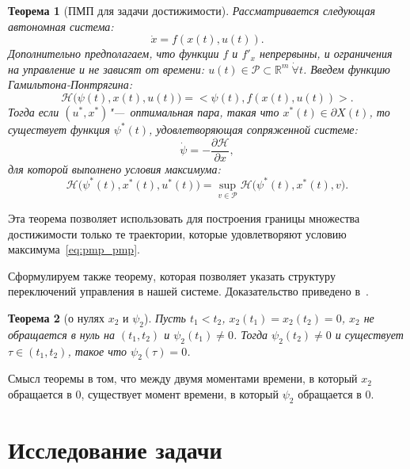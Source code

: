 \documentclass[12pt, a4paper]{article} %
\newtheorem{Th}{Теорема}
\newcommand{\Real}{\mathbb{R}}
\newcommand{\inner}[2]{\bigl< #1, #2 \bigr>}
\begin{document}
\begin{Th}[ПМП для задачи достижимости]\label{th:pmp}
    Рассматривается следующая автономная система:
    \begin{equation}\label{eq:pmp_sys}
        \dot x = f(x(t), u(t)).
    \end{equation} 
    Дополнительно предполагаем, что функции $f$ и $f'_x$ непрервыны,
    и ограничения на управление и не зависят от времени:
    $u(t) \in \mathcal{P} \subset \Real^{m}\ \dot \forall t$.
    Введем функцию Гамильтона-Понтрягина:
    \begin{equation}\label{eq:pmp_ham}
        \mathcal{H} \bigl( \psi(t), x(t), u(t) \bigr) = 
        \inner{\psi(t)}{f( x(t), u(t) )}.
    \end{equation} 
    Тогда если $(u^*, x^*)$"---~оптимальная пара,
    такая что  $x^*(t) \in \partial X(t)$, то существует функция $\psi^*(t)$,
    удовлетворяющая сопряженной системе:
    \begin{equation}\label{pmp_conj}
        \dot \psi = -\frac{\partial \mathcal{H}}{\partial x},
    \end{equation} 
    для которой выполнено условия максимума:
    \begin{equation}\label{eq:pmp_pmp}
         \mathcal{H} \bigl(\psi^*(t), x^*(t), u^*(t)\bigr) = 
         \sup\limits_{v \in \mathcal{P}} \mathcal{H} \bigl(\psi^*(t), x^*(t), v\bigr).
    \end{equation} 
\end{Th} 
Эта теорема позволяет использовать для построения границы множества
достижимости только те траектории, которые удовлетворяют условию максимума~\eqref{eq:pmp_pmp}.

Сформулируем также теорему, которая позволяет указать структуру переключений управления в нашей системе.
Доказательство приведено в~\cite{Komar}.
\begin{Th}[о нулях $x_2$ и $\psi_2$]
    Пусть $t_1 < t_2$, $x_2(t_1) = x_2(t_2) = 0$, $x_2$ не обращается в нуль 
    на $(t_1, t_2)$ и $\psi_2(t_1) \neq 0$.
    Тогда $\psi_2(t_2) \neq 0$ и существует $\tau \in (t_1, t_2)$, 
    такое что $\psi_2(\tau) = 0$.
\end{Th} 
Смысл теоремы в том, что между двумя моментами времени, в который $x_2$ обращается в $0$,
существует момент времени, в который  $\psi_2$ обращается в $0$.

\section{Исследование задачи}
\end{document}
